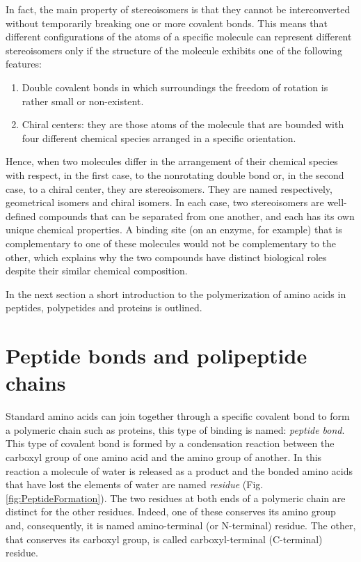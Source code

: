 In fact, the main property of stereoisomers is that they cannot be interconverted without temporarily breaking one or more covalent bonds. This means that different configurations of the atoms of a specific molecule can represent different stereoisomers only if the structure of the molecule exhibits one of the following features:
\begin{enumerate}
\item Double covalent bonds in which surroundings the freedom of rotation is rather small or non-existent.
\item Chiral centers: they are those atoms of the molecule that are bounded with four different chemical species arranged in a specific orientation. 
\end{enumerate}

Hence, when two molecules differ in the arrangement of their chemical species with respect, in the first case, to the nonrotating double bond or, in the second case, to a chiral center, they are stereoisomers. They are named respectively, geometrical isomers and chiral isomers. 
In each case, two stereoisomers are well-defined compounds that can be separated from one another, and each has its own unique chemical properties. A binding site (on an enzyme, for example) that is complementary to one of these molecules would not be complementary to the other, which explains why the two compounds have distinct biological roles despite their similar chemical composition.

In the next section a short introduction to the polymerization of amino acids in peptides, polypetides and proteins is outlined.

\section{Peptide bonds and polipeptide chains}\label{sec:peptitde}
Standard amino acids can join together through a specific covalent bond to form a polymeric chain such as proteins, this type of binding is named: \textit{peptide bond}. This type of covalent bond is formed by a condensation reaction between the carboxyl group of one amino acid and the amino group of another. In this reaction a molecule of water is released as a product and the bonded amino acids that have lost the elements of water are named \textit{residue} (Fig. \ref{fig:PeptideFormation}). The two residues at both ends of a polymeric chain are distinct for the other residues.
Indeed, one of these conserves its amino group and, consequently, it is named amino-terminal (or N-terminal) residue. The other, that conserves its carboxyl group, is called carboxyl-terminal (C-terminal) residue. 

